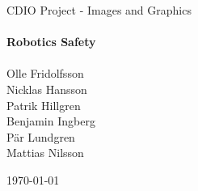 \begin{titlepage}

\begin{center}   

{\Large CDIO Project - Images and Graphics }\\[1cm]

\HRule \\[0.4cm]%
{\huge \bfseries Robotics Safety}\\[0.4cm]
\HRule \\[1.3cm]%


{\large Olle Fridolfsson\\
		Nicklas Hansson\\
		Patrik Hillgren\\		
		Benjamin Ingberg \\
		Pär Lundgren\\
		Mattias Nilsson\\
		}

\vfill

{\large \today}

\end{center}
\end{titlepage}